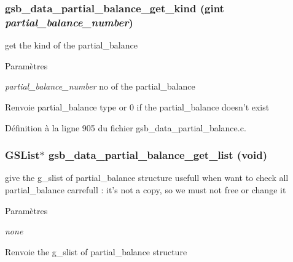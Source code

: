 \subsubsection[{gsb\_\-data\_\-partial\_\-balance\_\-get\_\-kind}]{ gsb\_\-data\_\-partial\_\-balance\_\-get\_\-kind (gint {\em partial\_\-balance\_\-number})}\label{gsb__data__partial__balance_8c_ae06d0d8f3876578c0c96fb902a2f1a64}
get the kind of the partial\_\-balance 
\begin{DoxyParams}{Paramètres}
\item[{\em partial\_\-balance\_\-number}]no of the partial\_\-balance\end{DoxyParams}
\begin{DoxyReturn}{Renvoie}
partial\_\-balance type or 0 if the partial\_\-balance doesn't exist 
\end{DoxyReturn}


Définition à la ligne 905 du fichier gsb\_\-data\_\-partial\_\-balance.c.

\subsubsection[{gsb\_\-data\_\-partial\_\-balance\_\-get\_\-list}]{\setlength{\rightskip}{0pt plus 5cm}GSList$\ast$ gsb\_\-data\_\-partial\_\-balance\_\-get\_\-list (void)}\label{gsb__data__partial__balance_8c_a09c15eba9140e6063aeaeb754481da19}
give the g\_\-slist of partial\_\-balance structure usefull when want to check all partial\_\-balance carrefull : it's not a copy, so we must not free or change it


\begin{DoxyParams}{Paramètres}
\item[{\em none}]\end{DoxyParams}
\begin{DoxyReturn}{Renvoie}
the g\_\-slist of partial\_\-balance structure 
\end{DoxyReturn}


